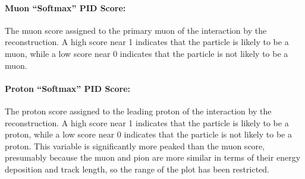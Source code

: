 \paragraph{Muon ``Softmax'' PID Score:}
The muon score assigned to the primary muon of the interaction by the reconstruction. A high score near 1 indicates that the particle is likely to be a muon, while a low score near 0 indicates that the particle is not likely to be a muon.

\paragraph{Proton ``Softmax'' PID Score:}
The proton score assigned to the leading proton of the interaction by the reconstruction. A high score near 1 indicates that the particle is likely to be a proton, while a low score near 0 indicates that the particle is not likely to be a proton. This variable is significantly more peaked than the muon score, presumably because the muon and pion are more similar in terms of their energy deposition and track length, so the range of the plot has been restricted.


